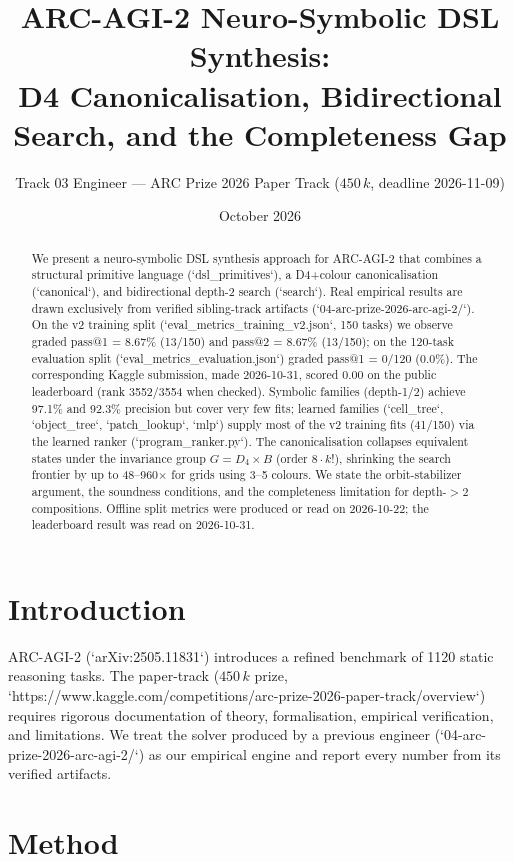 \documentclass[11pt,a4paper]{article}
\title{\textbf{ARC-AGI-2 Neuro-Symbolic DSL Synthesis:\\D4 Canonicalisation, Bidirectional Search, and the Completeness Gap}}
\author{Track 03 Engineer --- ARC Prize 2026 Paper Track ($450\,k$, deadline 2026-11-09)}
\date{October 2026}
\begin{document}
\maketitle

\begin{abstract}
We present a neuro-symbolic DSL synthesis approach for ARC-AGI-2 that combines a structural primitive language (`dsl_primitives`), a D4+colour canonicalisation (`canonical`), and bidirectional depth-2 search (`search`). Real empirical results are drawn exclusively from verified sibling-track artifacts (`04-arc-prize-2026-arc-agi-2/`). On the v2 training split (`eval_metrics_training_v2.json`, 150 tasks) we observe graded pass@1 = 8.67\% (13/150) and pass@2 = 8.67\% (13/150); on the 120-task evaluation split (`eval_metrics_evaluation.json`) graded pass@1 = 0/120 (0.0\%). The corresponding Kaggle submission, made 2026-10-31, scored 0.00 on the public leaderboard (rank 3552/3554 when checked). Symbolic families (depth-1/2) achieve 97.1\% and 92.3\% precision but cover very few fits; learned families (`cell_tree`, `object_tree`, `patch_lookup`, `mlp`) supply most of the v2 training fits (41/150) via the learned ranker (`program_ranker.py`). The canonicalisation collapses equivalent states under the invariance group $G = D_4 \times B$ (order $8 \cdot k!$), shrinking the search frontier by up to 48--960$\times$ for grids using 3--5 colours. We state the orbit-stabilizer argument, the soundness conditions, and the completeness limitation for depth-$>2$ compositions. Offline split metrics were produced or read on 2026-10-22; the leaderboard result was read on 2026-10-31.
\end{abstract}

\section{Introduction}

ARC-AGI-2 (`arXiv:2505.11831`) introduces a refined benchmark of 1120 static reasoning tasks. The paper-track ($450\,k$ prize, `https://www.kaggle.com/competitions/arc-prize-2026-paper-track/overview`) requires rigorous documentation of theory, formalisation, empirical verification, and limitations. We treat the solver produced by a previous engineer (`04-arc-prize-2026-arc-agi-2/`) as our empirical engine and report every number from its verified artifacts.

\section{Method}
\end{document}
